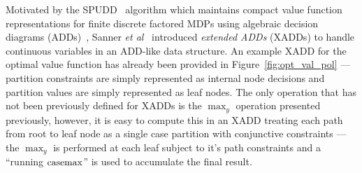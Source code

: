 Motivated by the SPUDD~\cite{spudd} algorithm which maintains compact
value function representations for finite discrete factored MDPs using
algebraic decision diagrams (ADDs)~\cite{bahar93add}, Sanner {\it et
al}~\cite{sanner_uai11} introduced \emph{extended ADDs} (XADDs) to handle
continuous variables in an ADD-like data structure.  An
example XADD for the optimal \MarsRover value function has already
been provided in Figure~\ref{fig:opt_val_pol} --- partition
constraints are simply represented as internal node decisions and
partition values are simply represented as leaf nodes.  The only
operation that has not been previously defined for XADDs is the
$\max_y$ operation presented previously, however, it is easy to
compute this in an XADD treating each path from root to leaf node
as a single case partition with conjunctive constraints --- the
$\max_y$ is performed at each leaf subject to it's path constraints
and a ``running $\mathrm{casemax}$'' is used to accumulate the final result.

